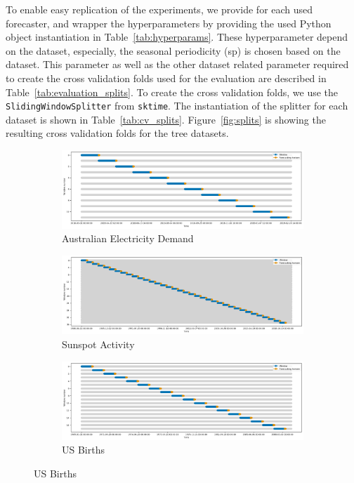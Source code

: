To enable easy replication of the experiments, we provide for each used forecaster, and wrapper the hyperparameters by providing the used Python object instantiation in Table~\ref{tab:hyperparams}. These hyperparameter depend on the dataset, especially, the seasonal periodicity (sp) is chosen based on the dataset. This parameter as well as the other dataset related parameter required to create the cross validation folds used for the evaluation are described in Table~\ref{tab:evaluation_splits}. To create the cross validation folds, we use the \texttt{SlidingWindowSplitter} from \texttt{sktime}. The instantiation of the splitter for each dataset is shown in Table~\ref{tab:cv_splits}. Figure~\ref{fig:splits} is showing the resulting cross validation folds for the tree datasets.

\begin{figure}
    \centering
    \begin{subfigure}{1\textwidth}
        \centering
        \includegraphics[width=\textwidth]{Figures/AusElecSplit.png}
        \caption{Australian Electricity Demand}
        \label{fig:aus_split}
    \end{subfigure}

    \begin{subfigure}{1\textwidth}
        \centering
        \includegraphics[width=\textwidth]{Figures/SunspotSplit.png}
        \caption{Sunspot Activity}
        \label{fig:sunspot_split}
    \end{subfigure}

    \begin{subfigure}{1\textwidth}
        \centering
        \includegraphics[width=\textwidth]{Figures/USBirthSplit.png}
        \caption{US Births}
        \label{fig:usbirth_split}


\end{subfigure}
\end{figure}
